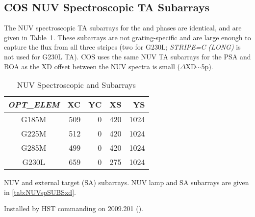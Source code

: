 \subsection{COS NUV Spectroscopic TA Subarrays}\label{subsec:NUVspSUBS}
The NUV spectroscopic TA subarrays for the  and  phases are identical, and are given in Table~\ref{tab:NUVspSUBSsad}.
These subarrays are not grating-specific and are large enough to capture the flux from all three stripes (two for G230L; \textit{STRIPE=C (LONG)} is not used for G230L TA).
COS uses the same NUV TA subarrays for the PSA and BOA as the XD offset between the NUV spectra is small ($\Delta$XD$\sim$5p).
\begin{table}
\centering
	\begin{threeparttable}[tbc]
		\caption[NUV Spectroscopic  and  Subarrays]{NUV Spectroscopic  and  Subarrays}
		\begin{tabular*}{.7\linewidth}{@{\extracolsep{\fill}}c|rrrr}
			\toprule
			\textit{OPT\_ELEM}& XC & YC & XS & YS \\
			\midrule
			G185M&509&0&420&1024\\
			G225M&512&0&420&1024\\
			G285M&499&0&420&1024\\
			G230L&659&0&275&1024\\
			\bottomrule
		\end{tabular*}
		\footnotesize
		\begin{tablenotes}[para]
			\item [1] NUV  and  external target (SA) subarrays.
			 NUV  lamp and SA subarrays are given in \ref{tab:NUVspSUBSxd}.
			\item [2] Installed by HST commanding on 2009.201 ().
		   \end{tablenotes}
		\label{tab:NUVspSUBSsad}
		\normalsize
	\end{threeparttable}
\end{table}

